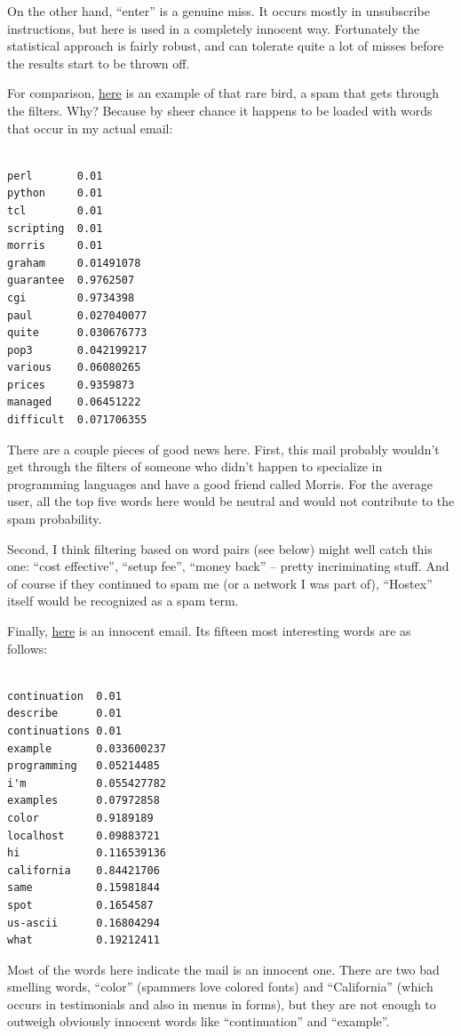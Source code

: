 On the other hand, ``enter'' is a genuine miss. It occurs mostly in
unsubscribe instructions, but here is used in a completely innocent way.
Fortunately the statistical approach is fairly robust, and can tolerate
quite a lot of misses before the results start to be thrown off.

For comparison,
\href{https://sep.turbifycdn.com/ty/cdn/paulgraham/hostexspam.txt?t=1688221954&}{here}
is an example of that rare bird, a spam that gets through the filters.
Why? Because by sheer chance it happens to be loaded with words that
occur in my actual email:

\begin{verbatim}

perl       0.01
python     0.01
tcl        0.01
scripting  0.01
morris     0.01
graham     0.01491078
guarantee  0.9762507
cgi        0.9734398
paul       0.027040077
quite      0.030676773
pop3       0.042199217
various    0.06080265
prices     0.9359873
managed    0.06451222
difficult  0.071706355
\end{verbatim}

There are a couple pieces of good news here. First, this mail probably
wouldn't get through the filters of someone who didn't happen to
specialize in programming languages and have a good friend called
Morris. For the average user, all the top five words here would be
neutral and would not contribute to the spam probability.

Second, I think filtering based on word pairs (see below) might well
catch this one: ``cost effective'', ``setup fee'', ``money back'' --
pretty incriminating stuff. And of course if they continued to spam me
(or a network I was part of), ``Hostex'' itself would be recognized as a
spam term.

Finally,
\href{https://sep.turbifycdn.com/ty/cdn/paulgraham/legit.txt?t=1688221954&}{here}
is an innocent email. Its fifteen most interesting words are as follows:

\begin{verbatim}

continuation  0.01
describe      0.01
continuations 0.01
example       0.033600237
programming   0.05214485 
i'm           0.055427782
examples      0.07972858 
color         0.9189189  
localhost     0.09883721
hi            0.116539136
california    0.84421706
same          0.15981844
spot          0.1654587
us-ascii      0.16804294
what          0.19212411
\end{verbatim}

Most of the words here indicate the mail is an innocent one. There are
two bad smelling words, ``color'' (spammers love colored fonts) and
``California'' (which occurs in testimonials and also in menus in
forms), but they are not enough to outweigh obviously innocent words
like ``continuation'' and ``example''.

